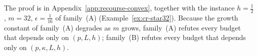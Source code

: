 The proof is in Appendix~\ref{app:recourse-convex}, together with the
instance $h=\frac12$, $m=32$, $\epsilon=\frac1{16}$ of family~(A)
(Example~\ref{ex:cr-star32}). Because
the growth constant of family~(A) degrades as $m$ grows, family~(A) refutes
every budget that depends only on $(p,L,h)$; family~(B) refutes every budget
that depends only on $(p,\kappa,L,h)$.
